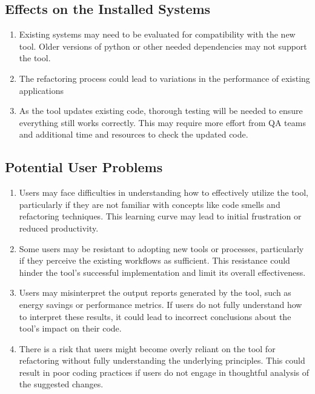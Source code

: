 \documentclass[12pt]{article}
\begin{document}
\subsection{Effects on the Installed Systems}
\begin{enumerate}
  \item Existing systems may need to be evaluated for compatibility with the new tool. Older versions of python or other needed dependencies may not support the tool.
  \item The refactoring process could lead to variations in the performance of existing applications
  \item As the tool updates existing code, thorough testing will be needed to ensure everything still works correctly. This may require more effort from QA teams and additional time and resources to check the updated code.
\end{enumerate}

\subsection{Potential User Problems}
\begin{enumerate}
  \item Users may face difficulties in understanding how to effectively utilize the tool, particularly if they are not familiar with concepts like code smells and refactoring techniques. This learning curve may lead to initial frustration or reduced productivity.
  \item Some users may be resistant to adopting new tools or processes, particularly if they perceive the existing workflows as sufficient. This resistance could hinder the tool's successful implementation and limit its overall effectiveness.
  \item Users may misinterpret the output reports generated by the tool, such as energy savings or performance metrics. If users do not fully understand how to interpret these results, it could lead to incorrect conclusions about the tool's impact on their code.
  \item There is a risk that users might become overly reliant on the tool for refactoring without fully understanding the underlying principles. This could result in poor coding practices if users do not engage in thoughtful analysis of the suggested changes.
\end{enumerate}
\end{document}
